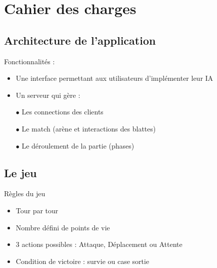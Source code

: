 \section{Cahier des charges}

\subsection{Architecture de l'application}
\begin{frame}[c]{\insertsubsection{}}
    \begin{block}{Fonctionnalités :}
        \begin{itemize}
        \item Une interface permettant aux utilisateurs d'implémenter leur IA \pause
        \item Un serveur qui gère :
        
            $\bullet$ Les connections des clients
            
            $\bullet$ Le match (arène et interactions des blattes)
            
            $\bullet$ Le déroulement de la partie (phases)
        \end{itemize}
    \end{block}
\end{frame}

\subsection{Le jeu}
\begin{frame}[c]{\insertsubsection{}}
        \begin{block}{Règles du jeu}
        \begin{itemize}
        \item Tour par tour
        \item Nombre défini de points de vie
        \item 3 actions possibles : Attaque, Déplacement ou Attente
        \item Condition de victoire : survie ou case sortie
        \end{itemize}
    \end{block}
\end{frame}


